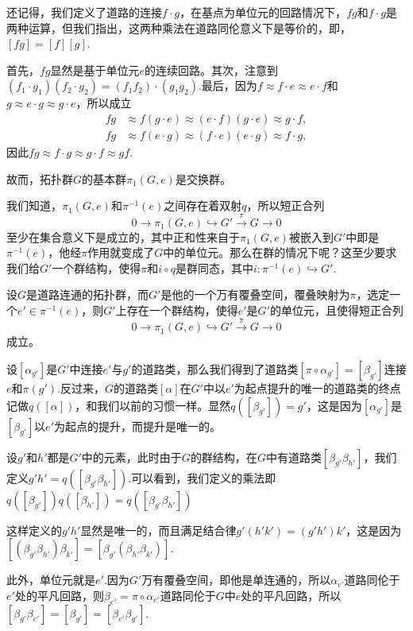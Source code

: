 还记得，我们定义了道路的连接$f\cdot g$，在基点为单位元的回路情况下，$fg$和$f\cdot g$是两种运算，但我们指出，这两种乘法在道路同伦意义下是等价的，即，$[fg]=[f][g]$.

首先，$fg$显然是基于单位元$e$的连续回路。其次，注意到$(f_1\cdot g_1)(f_2\cdot g_2)=(f_1f_2)\cdot (g_1g_2)$.最后，因为$f \approx f\cdot e \approx e\cdot f$和$g\approx e\cdot g \approx g\cdot e$，所以成立
\[
\begin{split}
	fg&\approx f(g\cdot e)\approx (e\cdot f)(g\cdot e) \approx g\cdot f,\\
	fg&\approx f(e\cdot g)\approx (f\cdot e)(e\cdot g) \approx f\cdot g,
\end{split}
\]
因此$fg \approx f\cdot g\approx g\cdot f \approx gf$.

\para 故而，拓扑群$G$的基本群$\pi_1(G,e)$是交换群。

\para 我们知道，$\pi_1(G,e)$和$\pi^{-1}(e)$之间存在着双射$q$，所以短正合列
\[
	0\to \pi_1(G,e)\hookrightarrow G' \xrightarrow{\pi} G\to 0
\]
至少在集合意义下是成立的，其中正和性来自于$\pi_1(G,e)$被嵌入到$G'$中即是$\pi^{-1}(e)$，他经$\pi$作用就变成了$G$中的单位元。那么在群的情况下呢？这至少要求我们给$G'$一个群结构，使得$\pi$和$i\circ q$是群同态，其中$i:\pi^{-1}(e)\hookrightarrow G'$.

\theo 设$G$是道路连通的拓扑群，而$G'$是他的一个万有覆叠空间，覆叠映射为$\pi$，选定一个$e'\in \pi^{-1}(e)$，则$G'$上存在一个群结构，使得$e'$是$G'$的单位元，且使得短正合列
\[
	0\to \pi_1(G,e)\hookrightarrow G' \xrightarrow{\pi} G\to 0
\]
成立。

\proof 设$[\alpha_{g'}]$是$G'$中连接$e'$与$g'$的道路类，那么我们得到了道路类$[\pi\circ \alpha_{g'}]=[\beta_{g'}]$连接$e$和$\pi(g')$.反过来，$G$的道路类$[\alpha]$在$G'$中以$e'$为起点提升的唯一的道路类的终点记做$q([\alpha])$，和我们以前的习惯一样。显然$q([\beta_{g'}])=g'$，这是因为$[\alpha_{g'}]$是$[\beta_{g'}]$以$e'$为起点的提升，而提升是唯一的。

设$g'$和$h'$都是$G'$中的元素，此时由于$G$的群结构，在$G$中有道路类$[\beta_{g'}\beta_{h'}]$，我们定义$g'h'=q([\beta_{g'}\beta_{h'}])$.可以看到，我们定义的乘法即$q([\beta_{g'}])q([\beta_{h'}])=q([\beta_{g'}\beta_{h'}])$

这样定义的$g'h'$显然是唯一的，而且满足结合律$g'(h'k')=(g'h')k'$，这是因为$[(\beta_{g'}\beta_{h'})\beta_{k'}]=[\beta_{g'}(\beta_{h'}\beta_{k'})]$.

此外，单位元就是$e'$.因为$G'$万有覆叠空间，即他是单连通的，所以$\alpha_{e'}$道路同伦于$e'$处的平凡回路，则$\beta_{e'}=\pi\circ \alpha_{e'}$道路同伦于$G$中$e$处的平凡回路，所以$[\beta_{g'}\beta_{e'}]=[\beta_{g'}]=[\beta_{e'}\beta_{g'}]$.


